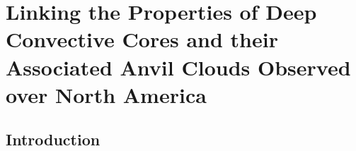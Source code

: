 \chapter{Linking the Properties of Deep Convective Cores and their Associated Anvil Clouds Observed over North America} \label{chp:lifecycle}








\section{Introduction}  %

